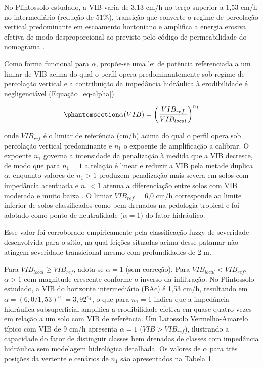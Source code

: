 \documentclass[
  brazilian,
  authoryear,
  preprint]{elsarticle}
\begin{document}
No Plintossolo estudado, a VIB varia de 3,13 cm/h no terço superior a
1,53 cm/h no intermediário (redução de 51\%), transição que converte o
regime de percolação vertical predominante em escoamento hortoniano e
amplifica a energia erosiva efetiva de modo desproporcional ao previsto
pelo código de permeabilidade do nomograma \citep{poesen_2018}.

Como forma funcional para \(\alpha\), propõe-se uma lei de potência
referenciada a um limiar de VIB acima do qual o perfil opera
predominantemente sob regime de percolação vertical e a contribuição da
impedância hidráulica à erodibilidade é negligenciável
(Equação~\ref{eq-alpha}).

\begin{equation}\phantomsection\label{eq-alpha}{
\alpha(VIB) = \left(\dfrac{VIB_{ref}}{VIB_{local}}\right)^{n_1}
}\end{equation}

onde \(VIB_{ref}\) é o limiar de referência (cm/h) acima do qual o
perfil opera sob percolação vertical predominante e \(n_1\) o expoente
de amplificação a calibrar. O expoente \(n_1\) governa a intensidade da
penalização à medida que a VIB decresce, de modo que para \(n_1 = 1\) a
relação é linear e reduzir a VIB pela metade duplica \(\alpha\),
enquanto valores de \(n_1 > 1\) produzem penalização mais severa em
solos com impedância acentuada e \(n_1 < 1\) atenua a diferenciação
entre solos com VIB moderada e muito baixa \citep{kinnell_2005}. O
limiar \(VIB_{ref}\) = 6,0 cm/h corresponde ao limite inferior de solos
classificados como bem drenados na pedologia tropical
\citep{embrapa_2018} e foi adotado como ponto de neutralidade
(\(\alpha = 1\)) do fator hidráulico.

Esse valor foi corroborado empiricamente pela classificação fuzzy de
severidade desenvolvida para o sítio, na qual feições situadas acima
desse patamar não atingem severidade transicional mesmo com
profundidades de 2 m.

Para \(VIB_{local} \geq VIB_{ref}\), adota-se \(\alpha = 1\) (sem
correção). Para \(VIB_{local} < VIB_{ref}\), \(\alpha > 1\) com
magnitude crescente conforme o inverso da infiltração. No Plintossolo
estudado, a VIB do horizonte intermediário (BAc) é 1,53 cm/h, resultando
em \(\alpha = (6{,}0/1{,}53)^{n_1} = 3{,}92^{n_1}\), o que para
\(n_1 = 1\) indica que a impedância hidráulica subsuperficial amplifica
a erodibilidade efetiva em quase quatro vezes em relação a um solo com
VIB de referência. Um Latossolo Vermelho-Amarelo típico com VIB de 9
cm/h apresenta \(\alpha = 1\) (\(VIB > VIB_{ref}\)), ilustrando a
capacidade do fator de distinguir classes bem drenadas de classes com
impedância hidráulica sem modelagem hidrológica detalhada. Os valores de
\(\alpha\) para três posições da vertente e cenários de \(n_1\) são
apresentados na Tabela 1.
\end{document}
